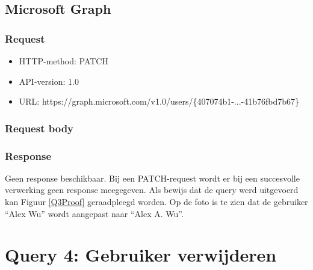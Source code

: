 \subsection{Microsoft Graph}

\subsubsection{Request}

\begin{itemize}
    \item \Ac{HTTP}-method: PATCH
    \item \ac{API}-version: 1.0
    \item \Ac{URL}: https://graph.microsoft.com/v1.0/users/\{407074b1-...-41b76fbd7b67\}
\end{itemize}

\subsubsection{Request body}


\subsubsection{Response}

Geen response beschikbaar. Bij een PATCH-request wordt er bij een succesvolle verwerking geen response meegegeven. Als bewijs dat de query werd uitgevoerd kan Figuur \ref{Q3Proof} geraadpleegd worden. Op de foto is te zien dat de gebruiker “Alex Wu” wordt aangepast naar “Alex A. Wu”. \\

\clearpage

\section{Query 4: Gebruiker verwijderen}


